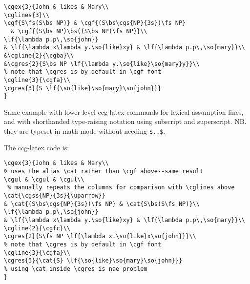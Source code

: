 \documentclass[11pt]{article}
\begin{document}
\begin{verbatim}
\cgex{3}{John & likes & Mary\\
\cglines{3}\\
\cgf{S\fs(S\bs NP)} & \cgf{(S\bs\cgs{NP}{3s})\fs NP} 
  & \cgf{(S\bs NP)\bs((S\bs NP)\fs NP)}\\
\lf{\lambda p.p\,\so{john}} 
& \lf{\lambda x\lambda y.\so{like}xy} & \lf{\lambda p.p\,\so{mary}}\\
&\cgline{2}{\cgba}\\
&\cgres{2}{S\bs NP \lf{\lambda y.\so{like}\so{mary}y}}\\  
% note that \cgres is by default in \cgf font
\cgline{3}{\cgfa}\\
\cgres{3}{S \lf{\so{like}\so{mary}\so{john}}}
}
\end{verbatim}

\newpage
Same example with lower-level ccg-latex commands for lexical assumption lines, and with shorthanded 
type-raising notation using subscript and superscript. NB. they are typeset in math mode without needing \verb|$..$|.\bigskip

\bigskip

The ccg-latex code is:

\begin{verbatim}
\cgex{3}{John & likes & Mary\\ 
% uses the alias \cat rather than \cgf above--same result
\cgul & \cgul & \cgul\\ 
 % manually repeats the columns for comparison with \cglines above 
\cat{\cgss{NP}{3s}{\uparrow}} 
& \cat{(S\bs\cgs{NP}{3s})\fs NP} & \cat{S\bs(S\fs NP)}\\
\lf{\lambda p.p\,\so{john}} 
& \lf{\lambda x\lambda y.\so{like}xy} & \lf{\lambda p.p\,\so{mary}}\\
\cgline{2}{\cgfc}\\
\cgres{2}{S\fs NP \lf{\lambda x.\so{like}x\so{john}}}\\  
% note that \cgres is by default in \cgf font
\cgline{3}{\cgfa}\\
\cgres{3}{\cat{S} \lf{\so{like}\so{mary}\so{john}}} 
% using \cat inside \cgres is nae problem
}
\end{verbatim}
\newpage
\end{document}

